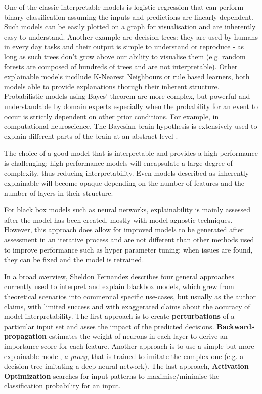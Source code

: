 \documentclass[proposal]{softeng}
\begin{document}
One of the classic interpretable models is logistic regression that can perform binary classification assuming the inputs and predictions are linearly dependent. Such models can be easily plotted on a graph for visualisation and are inherently easy to understand. Another example are decision trees: they are used by humans in every day tasks and their output is simple to understand or reproduce - as long as such trees don't grow above our ability to visualise them (e.g. random forests are composed of hundreds of trees and are not interpretable). Other explainable models incdlude K-Nearest Neighbours or rule based learners, both models able to provide explanations thorugh their inherent structure. Probabilistic models using Bayes' theorem are more complex, but powerful and understandable by domain experts especially when the probability for an event to occur is strictly dependent on other prior conditions. For example, in computational neuroscience, The Bayesian brain hypothesis is extensively used to explain different parts of the brain at an abstract level \cite{YairWeiss2002Miao}.
 
The choice of a good model that is interpretable and provides a high performance is challenging: high performance models will encapsulate a large degree of complexity, thus reducing interpretability. Even models described as inherently explainable will become opaque depending on the number of features and the number of layers in their structure. 

For black box models such as neural networks, explainability is mainly assessed after the model has been created, mostly with model agnostic techniques. However, this approach does allow for improved models to be generated after assessment in an iterative process and are not different than other methods used to improve performance such as hyper parameter tuning: when issues are found, they can be fixed and the model is retrained.

In a broad overview, Sheldon Fernandez \cite{fernandez-dark-ai} describes four general approaches currently used to interpret and explain blackbox models, which grew from theoretical scenarios into commercial specific use-cases, but usually as the author claims, with limited success and with exaggerated claims about the accuracy of model interpretability. The first approach is to create \textbf{perturbations} of a particular input set and asses the impact of the predicted decisions. \textbf{Backwards propagation} estimates the weight of neurons in each layer to derive an importance score for each feature. Another approach is to use a simple but more explainable model, \textit{a proxy}, that is trained to imitate the complex one (e.g. a decision tree imitating a deep neural network). The last approach, \textbf{Activation Optimization} searches for input patterns to maximise/minimise the classification probability for an input.  
\end{document}
